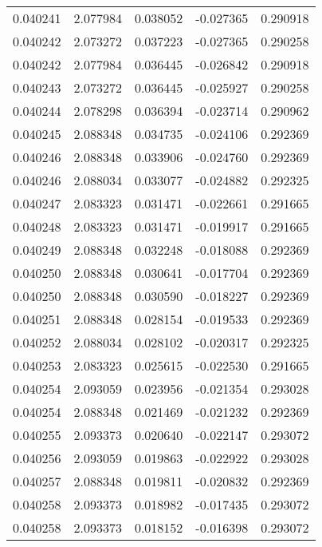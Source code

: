 \begin{tabular}{lrrrr}
0.040241    &  2.077984 &  0.038052 & -0.027365 &             0.290918 \\
0.040242    &  2.073272 &  0.037223 & -0.027365 &             0.290258 \\
0.040242    &  2.077984 &  0.036445 & -0.026842 &             0.290918 \\
0.040243    &  2.073272 &  0.036445 & -0.025927 &             0.290258 \\
0.040244    &  2.078298 &  0.036394 & -0.023714 &             0.290962 \\
0.040245    &  2.088348 &  0.034735 & -0.024106 &             0.292369 \\
0.040246    &  2.088348 &  0.033906 & -0.024760 &             0.292369 \\
0.040246    &  2.088034 &  0.033077 & -0.024882 &             0.292325 \\
0.040247    &  2.083323 &  0.031471 & -0.022661 &             0.291665 \\
0.040248    &  2.083323 &  0.031471 & -0.019917 &             0.291665 \\
0.040249    &  2.088348 &  0.032248 & -0.018088 &             0.292369 \\
0.040250    &  2.088348 &  0.030641 & -0.017704 &             0.292369 \\
0.040250    &  2.088348 &  0.030590 & -0.018227 &             0.292369 \\
0.040251    &  2.088348 &  0.028154 & -0.019533 &             0.292369 \\
0.040252    &  2.088034 &  0.028102 & -0.020317 &             0.292325 \\
0.040253    &  2.083323 &  0.025615 & -0.022530 &             0.291665 \\
0.040254    &  2.093059 &  0.023956 & -0.021354 &             0.293028 \\
0.040254    &  2.088348 &  0.021469 & -0.021232 &             0.292369 \\
0.040255    &  2.093373 &  0.020640 & -0.022147 &             0.293072 \\
0.040256    &  2.093059 &  0.019863 & -0.022922 &             0.293028 \\
0.040257    &  2.088348 &  0.019811 & -0.020832 &             0.292369 \\
0.040258    &  2.093373 &  0.018982 & -0.017435 &             0.293072 \\
0.040258    &  2.093373 &  0.018152 & -0.016398 &             0.293072 \\

\end{tabular}

